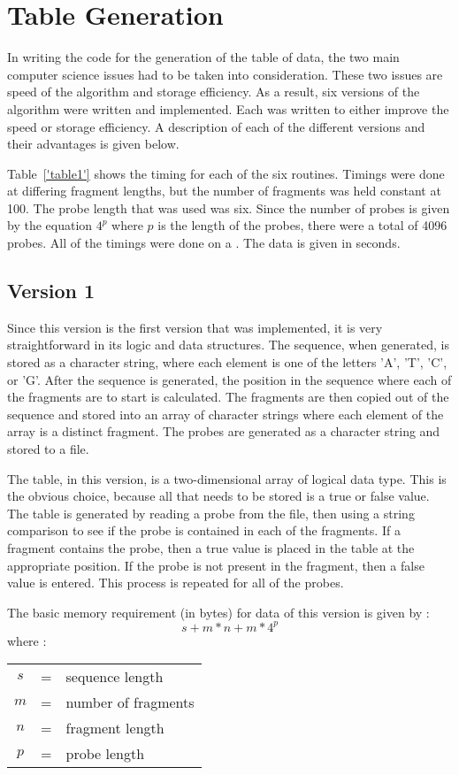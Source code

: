 \section{Table Generation}
In writing the code for the generation of the table of data, the
two main computer science issues had to be taken into consideration.  These
two issues are speed of the algorithm and storage efficiency.  As a result,
six versions of the algorithm were written and implemented.  Each was written
to either improve the speed or storage efficiency.  A
description of each of the different versions and their advantages is given
below.

Table~\ref{'table1'} shows the timing for each of the six
routines.  Timings were done at differing fragment lengths, but the number
of fragments was held constant at 100.  The probe length that was used was
six.  Since the number of probes is given by the equation $4^p$ where $p$
is the length of the probes, there were a total of 4096 probes.  All of the
timings were done on a \achilles.  The data is given in seconds.


\subsection{Version 1}
Since this version is the first version that was implemented, it is
very straightforward in its logic and data structures.  The sequence, when
generated, is stored as a character string, where each element is one of the
letters 'A', 'T', 'C', or 'G'.  After the sequence is generated, the position
in the sequence where each of the fragments are to start is calculated. 
The fragments are then copied out of the sequence and stored into an array
of character strings where each element of the array is a distinct
fragment.  The probes are generated as a character string and stored to a
file.

The table, in this version, is a two-dimensional array of logical data
type.  This is the obvious choice, because all that needs to be stored
is a true or false value.  The table is generated by reading a probe
from the file, then using a string comparison to see if the probe is
contained in each of the fragments.  If a fragment contains the probe, then
a true value is placed in the table at the appropriate position.
If the probe is not present in the fragment, then a false value is
entered.  This process is repeated for all of the probes.

The basic memory requirement (in bytes) for data of this version is given 
by :
\[ s + m*n + m*4^p \]
where :
\begin{center}
\begin{tabular}{ccl}
$s$ & = & sequence length \\
$m$ & = & number of fragments \\
$n$ & = & fragment length \\
$p$ & = & probe length
\end{tabular}
\end{center}

